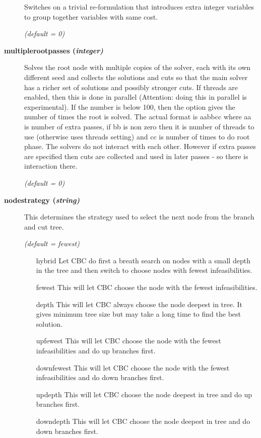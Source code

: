 \begin{description}
Switches on a trivial re-formulation that introduces extra integer variables to group together variables with same cost.

\textsl{(default = 0)}

\item[\label{multiplerootpasses}\hypertarget{multiplerootpasses}
{\textbf{multiplerootpasses (\slshape{integer})}}]\hspace{1.0in}

Solves the root node with multiple copies of the solver, each with its own different seed and collects the solutions and cuts so that the main solver has a richer set of solutions and possibly stronger cuts.
If threads are enabled, then this is done in parallel (Attention: doing this in parallel is experimental).
If the number is below 100, then the option gives the number of times the root is solved.
The actual format is aabbcc where aa is number of extra passes, if bb is non zero then it is number of threads to use (otherwise uses threads setting) and cc is number of times to do root phase.
The solvers do not interact with each other.  However if extra passes are specified then cuts are collected and used in later passes - so there is interaction there.

\textsl{(default = 0)}

\item[\label{nodestrategy}\hypertarget{nodestrategy}
{\textbf{nodestrategy (\slshape{string})}}]\hspace{1.0in}

This determines the strategy used to select the next node from the branch and cut tree.

\textsl{(default = fewest)}
\begin{itemize}
\item[hybrid] 
Let CBC do first a breath search on nodes with a small depth in the tree and then switch to choose nodes with fewest infeasibilities.
\item[fewest] 
This will let CBC choose the node with the fewest infeasibilities.
\item[depth] 
This will let CBC always choose the node deepest in tree.
It gives minimum tree size but may take a long time to find the best solution.
\item[upfewest] 
This will let CBC choose the node with the fewest infeasibilities and do up branches first.
\item[downfewest] 
This will let CBC choose the node with the fewest infeasibilities and do down branches first.
\item[updepth] 
This will let CBC choose the node deepest in tree and do up branches first.
\item[downdepth] 
This will let CBC choose the node deepest in tree and do down branches first.
\end{itemize}


\end{description}

